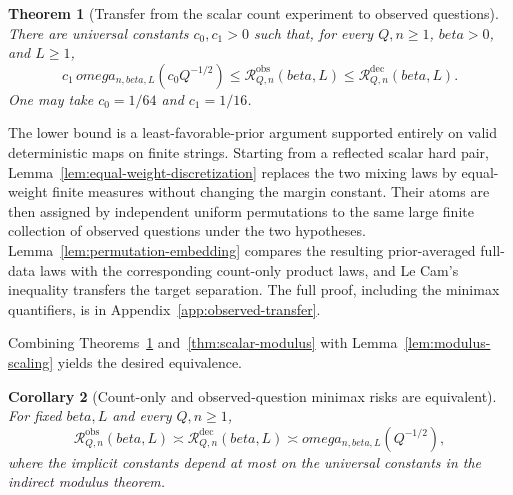 \documentclass[11pt]{article}
\def\beta{beta}%
\def\omega{omega}%
\newtheorem{theorem}{Theorem}[section]
\newtheorem{corollary}[theorem]{Corollary}
\newcommand{\calR}{\mathcal R}
\begin{document}
\begin{theorem}[Transfer from the scalar count experiment to observed questions]
\label{thm:observed-transfer}
There are universal constants $c_0,c_1>0$ such that, for every $Q,n\ge1$, $\beta>0$, and $L\ge1$,
\begin{equation}
\label{eq:observed-transfer}
 c_1\,\omega_{n,\beta,L}(c_0Q^{-1/2})
\le
\calR^{\mathrm{obs}}_{Q,n}(\beta,L)
\le
\calR^{\mathrm{dec}}_{Q,n}(\beta,L).
\end{equation}
One may take $c_0=1/64$ and $c_1=1/16$.
\end{theorem}

The lower bound is a least-favorable-prior argument supported entirely on valid deterministic maps on finite strings.  Starting from a reflected scalar hard pair, Lemma~\ref{lem:equal-weight-discretization} replaces the two mixing laws by equal-weight finite measures without changing the margin constant.  Their atoms are then assigned by independent uniform permutations to the same large finite collection of observed questions under the two hypotheses.  Lemma~\ref{lem:permutation-embedding} compares the resulting prior-averaged full-data laws with the corresponding count-only product laws, and Le Cam's inequality transfers the target separation.  The full proof, including the minimax quantifiers, is in Appendix~\ref{app:observed-transfer}.

Combining Theorems~\ref{thm:observed-transfer} and~\ref{thm:scalar-modulus} with Lemma~\ref{lem:modulus-scaling} yields the desired equivalence.

\begin{corollary}[Count-only and observed-question minimax risks are equivalent]
\label{cor:observed-modulus}
For fixed $\beta,L$ and every $Q,n\ge1$,
\begin{equation}
\label{eq:observed-modulus-equivalence}
\calR^{\mathrm{obs}}_{Q,n}(\beta,L)
\asymp
\calR^{\mathrm{dec}}_{Q,n}(\beta,L)
\asymp
\omega_{n,\beta,L}(Q^{-1/2}),
\end{equation}
where the implicit constants depend at most on the universal constants in the indirect modulus theorem.
\end{corollary}
\end{document}
